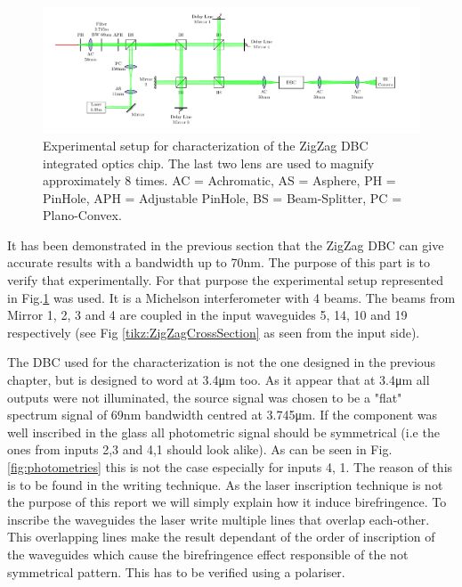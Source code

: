 \begin{figure}[htbp!]
 \centering
 \includegraphics[scale=.53]{../figures/montage.pdf}
 \caption{Experimental setup for characterization of the ZigZag DBC integrated optics chip. The last two lens are used to magnify approximately 8 times. AC = Achromatic, AS = Asphere, PH = PinHole, APH = Adjustable PinHole, BS = Beam-Splitter, PC = Plano-Convex.}
 \label{fig:expersetup}
\end{figure}
 
It has been demonstrated in the previous section that the ZigZag DBC can give accurate results with a bandwidth up to 70nm. The purpose of this part is to verify that experimentally. 
For that purpose the experimental setup represented in Fig.\ref{fig:expersetup} was used. It is a Michelson interferometer with 4 beams. The beams from Mirror 1, 2, 3 and 4 are coupled in the input waveguides 5, 14, 10 and 19 respectively (see Fig \ref{tikz:ZigZagCrossSection} as seen from the input side). 

The DBC used for the characterization is not the one designed in the previous chapter, but is designed to word at 3.4\si{\micro\meter} too. As it appear that at 3.4\si{\micro\meter} all outputs were not illuminated, the source signal was chosen to be a "flat" spectrum signal of 69nm bandwidth centred at 3.745\si{\micro\meter}. If the component was well inscribed in the glass all photometric signal should be symmetrical (i.e the ones from inputs 2,3 and 4,1 should look alike). As can be seen in Fig.\ref{fig:photometries} this is not the case especially for inputs 4, 1. The reason of this is to be found in the writing technique. As the laser inscription technique is not the purpose of this report we will simply explain how it induce birefringence. To inscribe the waveguides the laser write multiple lines that overlap each-other. This overlapping lines make the result dependant of the order of inscription of the waveguides which cause the birefringence effect responsible of the not symmetrical pattern. This has to be verified using a polariser.

